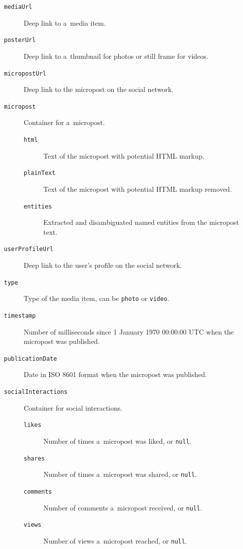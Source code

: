 \begin{description}
  \item[\texttt{mediaUrl}] Deep link to a~media item.
  \item[\texttt{posterUrl}] Deep link to a~thumbnail for photos
    or still frame for videos.
  \item[\texttt{micropostUrl}] Deep link to the micropost on
    the social network.
  \item[\texttt{micropost}] Container for a~micropost.
  \begin{description}
    \item[\texttt{html}] Text of the micropost with potential HTML
      markup.
    \item[\texttt{plainText}] Text of the micropost with
      potential HTML markup removed.
    \item[\texttt{entities}] Extracted and disambiguated
      named entities from the micropost text.
  \end{description}      
  \item[\texttt{userProfileUrl}] Deep link to the user's
    profile on the social network.
  \item[\texttt{type}] Type of the media item,
    can be \texttt{photo} or \texttt{video}.
  \item[\texttt{timestamp}] Number of milliseconds since
    1 January 1970 00:00:00 UTC when the micropost was
    published.
  \item[\texttt{publicationDate}] Date in ISO 8601
    format when the micropost was published. 
  \item[\texttt{socialInteractions}] Container for social
    interactions.
  \begin{description}  
  \item[\texttt{likes}] Number of times a~micropost was liked, or
    \texttt{null}.
  \item[\texttt{shares}] Number of times a~micropost was shared, or
    \texttt{null}.
  \item[\texttt{comments}] Number of comments a~micropost
    received, or \texttt{null}.
  \item[\texttt{views}] Number of views a~micropost reached, or
    \texttt{null}.
  \end{description}    
\end{description}


